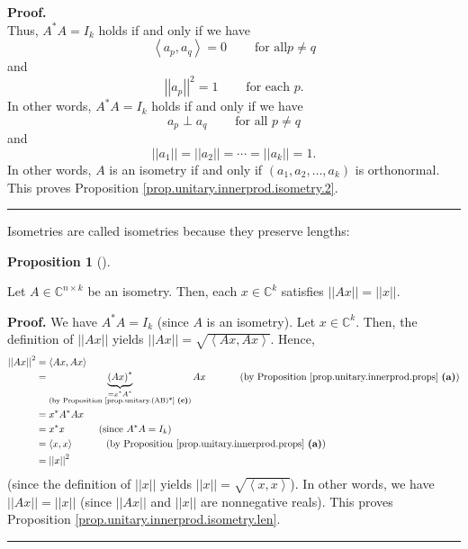 \documentclass[numbers=enddot,12pt,final,onecolumn,notitlepage]{scrartcl}%
\numberwithin{exer}{subsection}
\theoremstyle{definition}
\newtheorem{prop}[theo]{Proposition}
\newenvironment{proposition}[1][]
{\begin{prop}[#1]\begin{leftbar}}
{\end{leftbar}\end{prop}}
\newenvironment{proof}[1][Proof]{\noindent\textbf{#1.} }{\ \rule{0.5em}{0.5em}}
\begin{document}
\begin{proof}
\[\]
Thus, $A^{\ast}A=I_{k}$ holds if and only if we have%
\[
\left\langle a_{p},a_{q}\right\rangle =0\ \ \ \ \ \ \ \ \ \ \text{for all
}p\neq q
\]
and%
\[
\left\vert \left\vert a_{p}\right\vert \right\vert ^{2}%
=1\ \ \ \ \ \ \ \ \ \ \text{for each }p.
\]
In other words, $A^{\ast}A=I_{k}$ holds if and only if we have%
\[
a_{p}\perp a_{q}\ \ \ \ \ \ \ \ \ \ \text{for all }p\neq q
\]
and%
\[
\left\vert \left\vert a_{1}\right\vert \right\vert =\left\vert \left\vert
a_{2}\right\vert \right\vert =\cdots=\left\vert \left\vert a_{k}\right\vert
\right\vert =1.
\]
In other words, $A$ is an isometry if and only if $\left(  a_{1},a_{2}%
,\ldots,a_{k}\right)  $ is orthonormal. This proves Proposition
\ref{prop.unitary.innerprod.isometry.2}.
\end{proof}

Isometries are called isometries because they preserve lengths:

\begin{proposition}
\label{prop.unitary.innerprod.isometry.len}Let $A\in\mathbb{C}^{n\times k}$ be
an isometry. Then, each $x\in\mathbb{C}^{k}$ satisfies $\left\vert \left\vert
Ax\right\vert \right\vert =\left\vert \left\vert x\right\vert \right\vert $.
\end{proposition}

\begin{proof}
We have $A^{\ast}A=I_{k}$ (since $A$ is an isometry). Let $x\in\mathbb{C}^{k}%
$. Then, the definition of $\left\vert \left\vert Ax\right\vert \right\vert $
yields $\left\vert \left\vert Ax\right\vert \right\vert =\sqrt{\left\langle
Ax,Ax\right\rangle }$. Hence,%
\begin{align}
\left\vert \left\vert Ax\right\vert \right\vert ^{2}  &  =\left\langle
Ax,Ax\right\rangle \nonumber\\
&  =\underbrace{\left(  Ax\right)  ^{\ast}}_{\substack{=x^{\ast}A^{\ast
}\\\text{(by Proposition \ref{prop.unitary.(AB)*} \textbf{(c)})}%
}}Ax\ \ \ \ \ \ \ \ \ \ \left(  \text{by Proposition
\ref{prop.unitary.innerprod.props} \textbf{(a)}}\right) \nonumber\\
&  =x^{\ast}A^{\ast}Ax\label{pf.prop.unitary.innerprod.isometry.len.1}\\
&  =x^{\ast}x\ \ \ \ \ \ \ \ \ \ \left(  \text{since }A^{\ast}A=I_{k}\right)
\nonumber\\
&  =\left\langle x,x\right\rangle \ \ \ \ \ \ \ \ \ \ \left(  \text{by
Proposition \ref{prop.unitary.innerprod.props} \textbf{(a)}}\right)
\nonumber\\
&  =\left\vert \left\vert x\right\vert \right\vert ^{2}\nonumber
\end{align}
(since the definition of $\left\vert \left\vert x\right\vert \right\vert $
yields $\left\vert \left\vert x\right\vert \right\vert =\sqrt{\left\langle
x,x\right\rangle }$). In other words, we have $\left\vert \left\vert
Ax\right\vert \right\vert =\left\vert \left\vert x\right\vert \right\vert $
(since $\left\vert \left\vert Ax\right\vert \right\vert $ and $\left\vert
\left\vert x\right\vert \right\vert $ are nonnegative reals). This proves
Proposition \ref{prop.unitary.innerprod.isometry.len}.
\end{proof}
\end{document}
